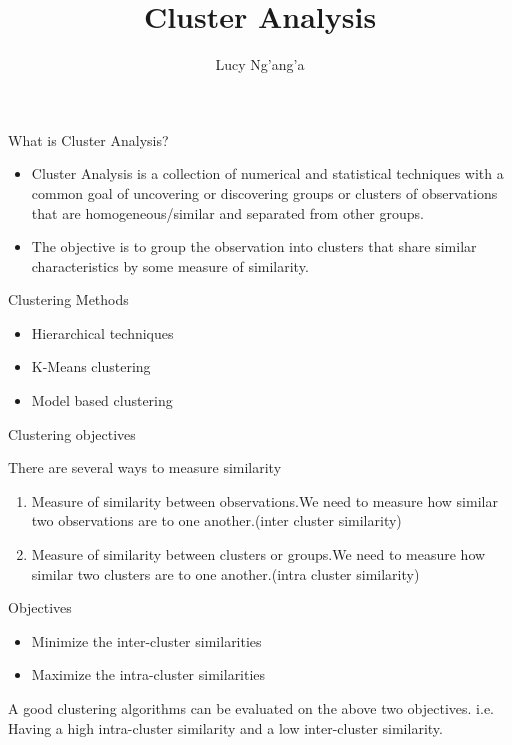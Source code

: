 \documentclass[10pt]{beamer}
\title[Probability and Statistics]{Cluster Analysis}
\author{Lucy Ng'ang'a}
\begin{document}


\begin{frame}
\maketitle
\end{frame}

\begin{frame}[fragile]{What is Cluster Analysis?}
\begin{block}{}
\begin{itemize}
\item Cluster Analysis is a collection of numerical and statistical techniques with a common goal of uncovering or discovering groups or clusters of observations that are homogeneous/similar and separated from other groups.
\item The objective is to group the observation into clusters that share similar characteristics by some measure of similarity.
\end{itemize}
\end{block}
\begin{block}{Clustering Methods}
\begin{itemize}
\item  Hierarchical techniques
\item  K-Means clustering 
\item  Model based clustering
\end{itemize}
\end{block}
\end{frame}


\begin{frame}{Clustering objectives}

\begin{block}{}
There are several ways to measure  similarity
\begin{enumerate}
\item Measure of similarity between observations.We need to measure how similar two observations are to one another.(inter cluster similarity)
\item Measure of similarity between clusters or groups.We need to measure how similar two clusters are to one another.(intra cluster similarity)
\end{enumerate}
\end{block}
\begin{block}{Objectives}
\begin{itemize}
\item Minimize the inter-cluster similarities
\item Maximize the intra-cluster similarities
\end{itemize}
A good clustering algorithms can be evaluated on the above two objectives. i.e. Having a high intra-cluster similarity and a low inter-cluster similarity.
\end{block}
\end{frame}
\end{document}

